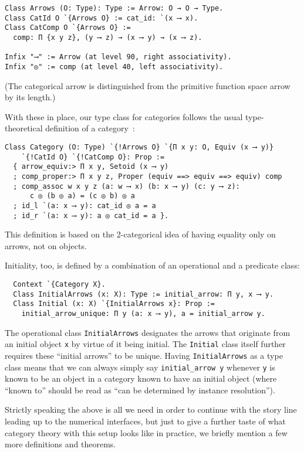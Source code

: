 \documentclass[a4paper,10pt,runningheads]{llncs}
\begin{document}
\begin{lstlisting}
Class Arrows (O: Type): Type := Arrow: O → O → Type.
Class CatId O `{Arrows O} := cat_id: `(x ⟶ x).
Class CatComp O `{Arrows O} :=
  comp: Π {x y z}, (y ⟶ z) → (x ⟶ y) → (x ⟶ z).

Infix "⟶" := Arrow (at level 90, right associativity).
Infix "◎" := comp (at level 40, left associativity).
\end{lstlisting}
(The categorical arrow is distinguished from the primitive function space arrow by its length.)

With these in place, our type class for categories follows the usual type-theoretical definition of a
category~\cite{saibi1995constructive}:

\begin{lstlisting}
Class Category (O: Type) `{!Arrows O} `{Π x y: O, Equiv (x ⟶ y)}
    `{!CatId O} `{!CatComp O}: Prop :=
  { arrow_equiv:> Π x y, Setoid (x ⟶ y)
  ; comp_proper:> Π x y z, Proper (equiv ==> equiv ==> equiv) comp
  ; comp_assoc w x y z (a: w ⟶ x) (b: x ⟶ y) (c: y ⟶ z):
      c ◎ (b ◎ a) = (c ◎ b) ◎ a
  ; id_l `(a: x ⟶ y): cat_id ◎ a = a
  ; id_r `(a: x ⟶ y): a ◎ cat_id = a }.
\end{lstlisting}
This definition is based on the 2-categorical idea of having equality only on arrows, not on objects.

Initiality, too, is defined by a combination of an operational and a predicate class:
\begin{lstlisting}
  Context `{Category X}.
  Class InitialArrows (x: X): Type := initial_arrow: Π y, x ⟶ y.
  Class Initial (x: X) `{InitialArrows x}: Prop :=
    initial_arrow_unique: Π y (a: x ⟶ y), a = initial_arrow y.
\end{lstlisting}
The operational class \lstinline|InitialArrows| designates the arrows that originate from an initial object \lstinline|x| by virtue of it being initial. The \lstinline|Initial| class itself further requires these ``initial arrows'' to be unique. Having \lstinline|InitialArrows| as a type class means that we can always simply say \lstinline|initial_arrow y| whenever \lstinline|y| is known to be an object in a category known to have an initial object (where ``known to'' should be read as ``can be determined by instance resolution'').

Strictly speaking the above is all we need in order to continue with the story line leading up to the numerical interfaces, but just to give a further taste of what category theory with this setup looks like in practice, we briefly mention a few more definitions and theorems.
\end{document}
